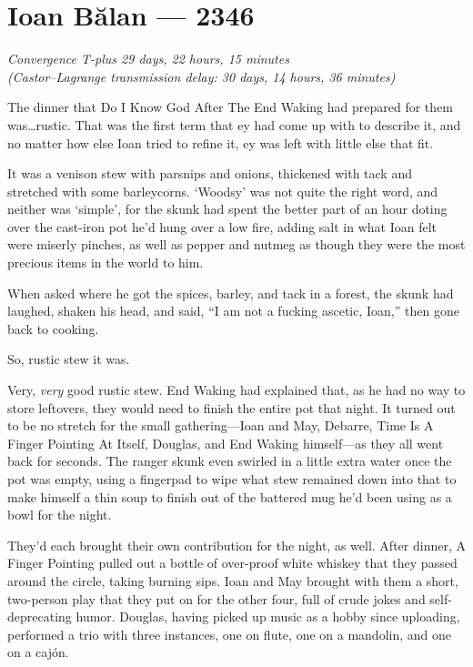 \hypertarget{ioan-bux103lan-2346}{%
\chapter{Ioan Bălan — 2346}}

\begin{center}
\emph{Convergence T-plus 29 days, 22 hours, 15 minutes}\\
\emph{(Castor--Lagrange transmission delay: 30 days, 14 hours, 36 minutes)}
\end{center}

\noindent The dinner that Do I Know God After The End Waking had prepared for them was\ldots rustic. That was the first term that ey had come up with to describe it, and no matter how else Ioan tried to refine it, ey was left with little else that fit.

It was a venison stew with parsnips and onions, thickened with tack and stretched with some barleycorns. `Woodsy' was not quite the right word, and neither was `simple', for the skunk had spent the better part of an hour doting over the cast-iron pot he'd hung over a low fire, adding salt in what Ioan felt were miserly pinches, as well as pepper and nutmeg as though they were the most precious items in the world to him.

When asked where he got the spices, barley, and tack in a forest, the skunk had laughed, shaken his head, and said, ``I am not a fucking ascetic, Ioan,'' then gone back to cooking.

So, rustic stew it was.

Very, \emph{very} good rustic stew. End Waking had explained that, as he had no way to store leftovers, they would need to finish the entire pot that night. It turned out to be no stretch for the small gathering—Ioan and May, Debarre, Time Is A Finger Pointing At Itself, Douglas, and End Waking himself—as they all went back for seconds. The ranger skunk even swirled in a little extra water once the pot was empty, using a fingerpad to wipe what stew remained down into that to make himself a thin soup to finish out of the battered mug he'd been using as a bowl for the night.

They'd each brought their own contribution for the night, as well. After dinner, A Finger Pointing pulled out a bottle of over-proof white whiskey that they passed around the circle, taking burning sips. Ioan and May brought with them a short, two-person play that they put on for the other four, full of crude jokes and self-deprecating humor. Douglas, having picked up music as a hobby since uploading, performed a trio with three instances, one on flute, one on a mandolin, and one on a cajón.

